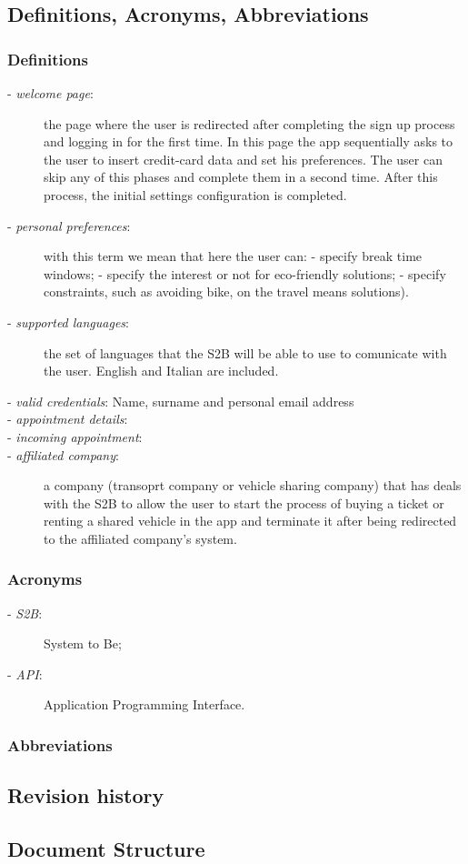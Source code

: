 \subsection{Definitions, Acronyms, Abbreviations}
	\subsubsection{Definitions}
		\begin{description}
			\item[- \textit{welcome page}:] the page where the user is redirected after completing the sign up process and logging in for the first time. In this page the app sequentially  asks to the user to insert credit-card data and set his preferences. The user can skip any of this phases and complete them in a second time. After this process, the initial settings configuration is completed.
			\item[- \textit{personal preferences}:] with this term we mean that here the user can:\newline
			- specify break time windows; \newline
			- specify the interest or not for eco-friendly solutions;\newline
			- specify constraints, such as avoiding  bike, on the travel means solutions).
			\item[- \textit{supported languages}:] the set of languages that the S2B will be able to use to comunicate with the user. English and Italian are included.
			\item[- \textit{valid credentials}: Name, surname and personal email address]
			\item[- \textit{appointment details}:]
			\item[- \textit{incoming appointment}:]
			\item[- \textit{affiliated company}:] a company (transoprt company or vehicle sharing company) that has deals with the S2B to allow the user to start the process of buying a ticket or renting a shared vehicle in the app and terminate it after being redirected to the affiliated company's system.
		\end{description}
	\subsubsection{Acronyms}
		\begin{description}
		\item[- \textit{S2B}:] System to Be;
		\item[- \textit{API}:] Application Programming Interface.
	\end{description}
	\subsubsection{Abbreviations}
\subsection{Revision history}
\subsection{Document Structure}